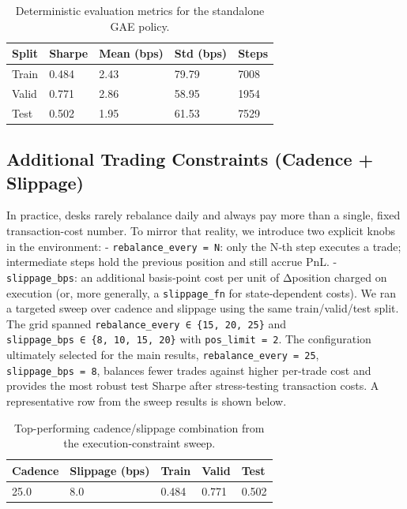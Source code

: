 \documentclass[,11pt,letterpaper,twocolumn]{article}
\begin{document}
\begin{table}[ht]
\centering
\caption{Deterministic evaluation metrics for the standalone GAE
policy.}\label{tab:det-metrics}
\begin{tabular}{lllll}
\toprule
Split & Sharpe & Mean (bps) & Std (bps) & Steps \\
\midrule
Train & 0.484 & 2.43 & 79.79 & 7008 \\
Valid & 0.771 & 2.86 & 58.95 & 1954 \\
Test & 0.502 & 1.95 & 61.53 & 7529 \\
\bottomrule
\end{tabular}
\end{table}

\subsection{Additional Trading Constraints (Cadence +
Slippage)}\label{realistic-trading-constraints-cadence-slippage}

In practice, desks rarely rebalance daily and always pay more than a
single, fixed transaction-cost number. To mirror that reality, we
introduce two explicit knobs in the environment: -
\texttt{rebalance\_every\ =\ N}: only the N‑th step executes a trade;
intermediate steps hold the previous position and still accrue PnL. -
\texttt{slippage\_bps}: an additional basis‑point cost per unit of
\textbar Δposition\textbar{} charged on execution (or, more generally, a
\texttt{slippage\_fn} for state‑dependent costs). We ran a targeted
sweep over cadence and slippage using the same train/valid/test split.
The grid spanned \texttt{rebalance\_every\ ∈\ \{15,\ 20,\ 25\}} and
\texttt{slippage\_bps\ ∈\ \{8,\ 10,\ 15,\ 20\}} with
\texttt{pos\_limit\ =\ 2}. The configuration ultimately selected for the
main results, \texttt{rebalance\_every\ =\ 25},
\texttt{slippage\_bps\ =\ 8}, balances fewer trades against higher
per‑trade cost and provides the most robust test Sharpe after
stress-testing transaction costs. A representative row from the sweep
results is shown below.

\begin{table}[ht]
\centering
\caption{Top-performing cadence/slippage combination from the
execution-constraint sweep.}\label{tab:cadence-slippage}
\begin{tabular}{lllll}
\toprule
Cadence & Slippage (bps) & Train & Valid & Test \\
\midrule
25.0 & 8.0 & 0.484 & 0.771 & 0.502 \\
\bottomrule
\end{tabular}
\end{table}
\end{document}
